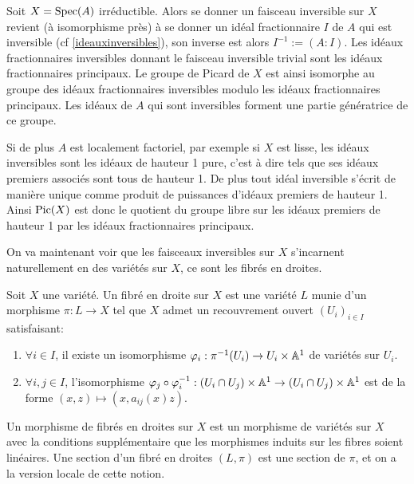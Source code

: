 \begin{ex}\label{expicaff}
Soit $X=\operatorname{Spec} (A)$ irréductible. Alors se donner un faisceau inversible sur $X$ revient (à isomorphisme près) à se donner un idéal fractionnaire $I$ de $A$ qui est inversible (cf \ref{ideauxinversibles}), son inverse est alors $I^{-1}:=(A:I)$. Les idéaux fractionnaires inversibles donnant le faisceau inversible trivial sont les idéaux fractionnaires principaux. Le groupe de Picard de $X$ est ainsi isomorphe au groupe des idéaux fractionnaires inversibles modulo les idéaux fractionnaires principaux. Les idéaux de $A$ qui sont inversibles forment une partie génératrice de ce groupe. 

Si de plus $A$ est localement factoriel, par exemple si $X$ est lisse, les idéaux inversibles sont les idéaux de hauteur 1 pure, c'est à dire tels que ses idéaux premiers associés sont tous de hauteur 1. De plus tout idéal inversible s'écrit de manière unique comme produit de puissances d'idéaux premiers de hauteur 1. Ainsi $\operatorname{Pic}(X)$ est donc le quotient du groupe libre sur les idéaux premiers de hauteur 1 par les idéaux fractionnaires principaux.
\end{ex}

On va maintenant voir que les faisceaux inversibles sur $X$ s'incarnent naturellement en des variétés sur $X$, ce sont les fibrés en droites.

\begin{defn}\label{linebundle}
Soit $X$ une variété. Un fibré en droite sur $X$ est une variété $L$ munie d'un morphisme $\pi:L\rightarrow X$ tel que $X$ admet un recouvrement ouvert $(U_i)_{i\in I}$ satisfaisant:

\begin{enumerate}
\item $\forall i\in I$, il existe un isomorphisme $\varphi_i :\pi^{-1}(U_i)\rightarrow U_i\times\mathbb{A}^1$ de variétés sur $U_i$.
\item $\forall i, j\in I$, l'isomorphisme $\varphi_j\circ \varphi_i^{-1}: (U_i\cap U_j)\times \mathbb{A}^1\rightarrow (U_i\cap U_j)\times \mathbb{A}^1$ est de la forme $(x, z)\mapsto (x, a_{ij}(x)z)$.
\end{enumerate}
Un morphisme de fibrés en droites sur $X$ est un morphisme de variétés sur $X$ avec la conditions supplémentaire que les morphismes induits sur les fibres soient linéaires.
Une section d'un fibré en droites $(L, \pi)$ est une section de $\pi$, et on a la version locale de cette notion.
\end{defn}

